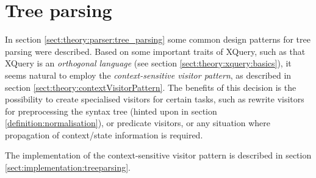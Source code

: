 \section{Tree parsing}
\label{sect:method:tree_parsing}
In section \ref{sect:theory:parser:tree_parsing} some common design patterns
for tree parsing were described. Based on some important traits of XQuery, such
as that XQuery is an \textit{orthogonal language} (see section
\ref{sect:theory:xquery:basics}), it seems natural to employ the
\textit{context-sensitive visitor pattern}, as described in section
\ref{sect:theory:contextVisitorPattern}. The benefits of this decision is the
possibility to create specialised visitors for certain tasks, such as rewrite
visitors for preprocessing the syntax tree (hinted upon in section
\ref{definition:normalisation}), or predicate visitors, or any situation where
propagation of context/state information is required.

The implementation of the context-sensitive visitor pattern is described in
section \ref{sect:implementation:treeparsing}. 
